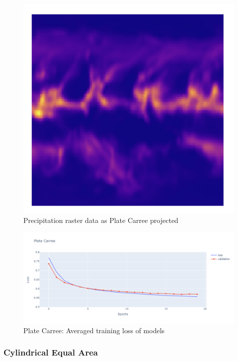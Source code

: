 \begin{figure}[h]
\begin{minipage}{0.30\textwidth}
        \label{fig:eqc_prect_raster}
    \end{minipage}\hfill
    \begin{minipage}{0.30\textwidth}
        \centering
        \includegraphics[width=0.9\linewidth]{figures/chapter-8/plate_caree_prect_raster.png}
        \caption{Precipitation raster data as Plate Carree projected}
        \label{fig:eqc_prect_raster}
    \end{minipage}\hfill
\end{figure}

\begin{figure}[h]
    \centering
    \includegraphics[width=1.0\linewidth]{figures/chapter-8/pc_loss.png}
    \caption{Plate Carree: Averaged training loss of models  }
    \label{fig:pc_loss}
\end{figure}


\subsubsection*{Cylindrical Equal Area}

